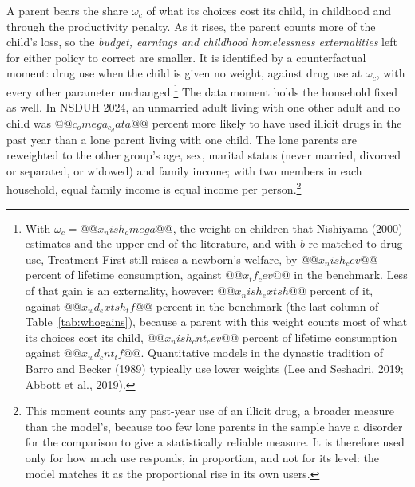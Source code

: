 \documentclass[10pt]{article}
\begin{document}
\begin{description}\setlength{\itemsep}{0.25em}\setlength{\parskip}{0em}
\item[$\omega_c$, the parent's weight on its child.] A parent bears the share $\omega_c$ of what its choices cost its child, in childhood and through the productivity penalty. As it rises, the parent counts more of the child's loss, so the \emph{budget, earnings and childhood homelessness externalities} left for either policy to correct are smaller. It is identified by a counterfactual moment: drug use when the child is given no weight, against drug use at $\omega_c$, with every other parameter unchanged.\footnote{With $\omega_c=@@x_nish_omega@@$, the weight on children that Nishiyama (2000) estimates and the upper end of the literature, and with $b$ re-matched to drug use, Treatment First still raises a newborn's welfare, by $@@x_nish_cev@@$ percent of lifetime consumption, against $@@x_tf_cev@@$ in the benchmark. Less of that gain is an externality, however: $@@x_nish_extsh@@$ percent of it, against $@@x_wd_extsh_tf@@$ percent in the benchmark (the last column of Table~\ref{tab:whogains}), because a parent with this weight counts most of what its choices cost its child, $@@x_nish_cnt_cev@@$ percent of lifetime consumption against $@@x_wd_cnt_tf@@$. Quantitative models in the dynastic tradition of Barro and Becker (1989) typically use lower weights (Lee and Seshadri, 2019; Abbott et al., 2019).} The data moment holds the household fixed as well. In NSDUH 2024, an unmarried adult living with one other adult and no child was $@@c_omega_c_data@@$ percent more likely to have used illicit drugs in the past year than a lone parent living with one child. The lone parents are reweighted to the other group's age, sex, marital status (never married, divorced or separated, or widowed) and family income; with two members in each household, equal family income is equal income per person.\footnote{This moment counts any past-year use of an illicit drug, a broader measure than the model's, because too few lone parents in the sample have a disorder for the comparison to give a statistically reliable measure. It is therefore used only for how much use responds, in proportion, and not for its level: the model matches it as the proportional rise in its own users.}

\end{description}
\end{document}
